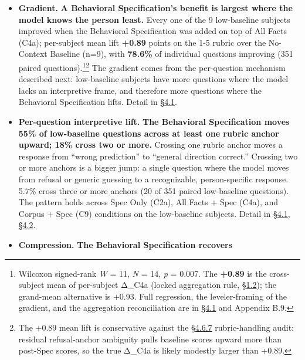 \begin{itemize}
\tightlist
\item
  \textbf{Gradient.} \textbf{A Behavioral Specification's benefit is
  largest where the model knows the person least.} Every one of the 9
  low-baseline subjects improved when the Behavioral Specification was
  added on top of All Facts (C4a); per-subject mean lift \textbf{+0.89}
  points on the 1-5 rubric over the No-Context Baseline (n=9), with
  \textbf{78.6\%} of individual questions improving (351 paired
  questions).\footnote{Wilcoxon signed-rank \emph{W} = 11, \emph{N} =
    14, \emph{p} = 0.007. The \textbf{+0.89} is the cross-subject mean
    of per-subject Δ\_C4a (locked aggregation rule, \hyperref[what-we-tested]{§1.2}); the
    grand-mean alternative is +0.93. Full regression, the
    leveler-framing of the gradient, and the aggregation reconciliation
    are in \hyperref[the-cross-subject-gradient-and-its-per-question-mechanism]{§4.1} and Appendix B.9.}\footnote{The +0.89 mean lift is
    conservative against the \hyperref[rubric-handling-limitations-post-hoc-validity-audit-1]{§4.6.7} rubric-handling audit: residual
    refusal-anchor ambiguity pulls baseline scores upward more than
    post-Spec scores, so the true Δ\_C4a is likely modestly larger than
    +0.89.} The gradient comes from the
  per-question mechanism described next: low-baseline subjects have more
  questions where the model lacks an interpretive frame, and therefore
  more questions where the Behavioral Specification lifts. Detail in
  \hyperref[the-cross-subject-gradient-and-its-per-question-mechanism]{§4.1}.
\item
  \textbf{Per-question interpretive lift.} \textbf{The Behavioral
  Specification moves 55\% of low-baseline questions across at least one
  rubric anchor upward; 18\% cross two or more.} Crossing one
  rubric anchor moves a response from ``wrong prediction'' to ``general
  direction correct.'' Crossing two or more anchors is a bigger jump: a
  single question where the model moves from refusal or generic guessing
  to a recognizable, person-specific response. 5.7\% cross three or more
  anchors (20 of 351 paired low-baseline questions). The pattern holds
  across Spec Only (C2a), All Facts + Spec (C4a), and Corpus + Spec (C9)
  conditions on the low-baseline subjects. Detail in \hyperref[the-cross-subject-gradient-and-its-per-question-mechanism]{§4.1}, \hyperref[compression-structure-vs.-raw-text]{§4.2}.
\item
  \textbf{Compression.} \textbf{The Behavioral Specification recovers
}
\end{itemize}
